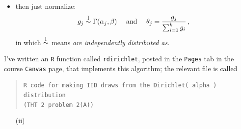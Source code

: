 \documentclass[12pt]{article}
\begin{document}
\begin{itemize}
\begin{itemize}
\begin{itemize}
\item

then just normalize:
\begin{equation} \label{e:multinomial-14}
g_j \stackrel{ \textrm{\footnotesize I} }{ \sim } \Gamma ( \alpha_j , \beta ) \ \ \ \textrm{ and } \ \ \ \theta_j = \frac{ g_j }{ \sum_{ i = 1 }^k g_i } \, ,
\end{equation}
in which $\stackrel{ \textrm{\footnotesize I} }{ \sim }$ means \textit{are independently distributed as}.

\end{itemize}

I've written an \texttt{R} function called \texttt{rdirichlet}, posted in the \texttt{Pages} tab in the course \verb|Canvas| page, that implements this algorithm; the relevant file is called

\begin{quote}

\texttt{R code for making IID draws from the Dirichlet( alpha ) distribution} \\ \texttt{(THT 2 problem 2(A))}

\end{quote}

\begin{itemize}

\item[(ii)]


\end{itemize}
\end{itemize}
\end{itemize}
\end{document}
